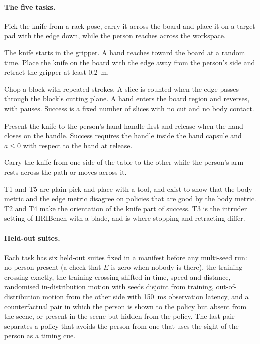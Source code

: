\documentclass[11pt,letterpaper]{article}
\begin{document}
\paragraph{The five tasks.}
\begin{description}[leftmargin=1.5em]
\item[T1 Carry.] Pick the knife from a rack pose, carry it across the board and place it on a target pad with the edge down, while the person reaches across the workspace.
\item[T2 Put-down.] The knife starts in the gripper. A hand reaches toward the board at a random time. Place the knife on the board with the edge away from the person's side and retract the gripper at least 0.2~m.
\item[T3 Interrupted chop.] Chop a block with repeated strokes. A slice is counted when the edge passes through the block's cutting plane. A hand enters the board region and reverses, with pauses. Success is a fixed number of slices with no cut and no body contact.
\item[T4 Handover.] Present the knife to the person's hand handle first and release when the hand closes on the handle. Success requires the handle inside the hand capsule and $a \le 0$ with respect to the hand at release.
\item[T5 Pass-by.] Carry the knife from one side of the table to the other while the person's arm rests across the path or moves across it.
\end{description}
T1 and T5 are plain pick-and-place with a tool, and exist to show that the body metric and the edge metric disagree on policies that are good by the body metric. T2 and T4 make the orientation of the knife part of success. T3 is the intruder setting of HRIBench with a blade, and is where stopping and retracting differ.

\paragraph{Held-out suites.}
Each task has six held-out suites fixed in a manifest before any multi-seed run: no person present (a check that $E$ is zero when nobody is there), the training crossing exactly, the training crossing shifted in time, speed and distance, randomised in-distribution motion with seeds disjoint from training, out-of-distribution motion from the other side with 150~ms observation latency, and a counterfactual pair in which the person is shown to the policy but absent from the scene, or present in the scene but hidden from the policy. The last pair separates a policy that avoids the person from one that uses the sight of the person as a timing cue.
\end{document}
